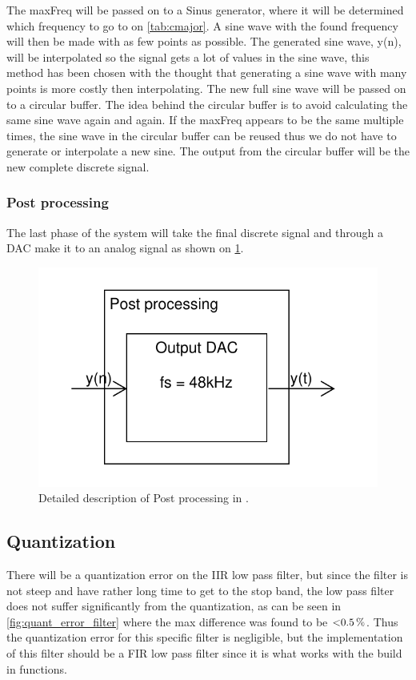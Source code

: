 The maxFreq will be passed on to a Sinus generator, where it will be determined which frequency to go to on \cref{tab:cmajor}.
A sine wave with the found frequency will then be made with as few points as possible.
The generated sine wave, y(n), will be interpolated so the signal gets a lot of values in the sine wave, this method has been chosen with the thought that generating a sine wave with many points is more costly then interpolating.
The new full sine wave will be passed on to a circular buffer.
The idea behind the circular buffer is to avoid calculating the same sine wave again and again.
If the maxFreq appears to be the same multiple times, the sine wave in the circular buffer can be reused thus we do not have to generate or interpolate a new sine.
The output from the circular buffer will be the new complete discrete signal.

\subsubsection{Post processing}
The last phase of the system will take the final discrete signal and through a DAC make it to an analog signal as shown on \cref{fig:DetailedPostPro}.
\begin{figure}
	\centering
	\includegraphics[width=1\linewidth]{gfx/Design/DesignPostPro_IF.pdf}
	\caption{Detailed description of Post processing in \systemName.}
	\label{fig:DetailedPostPro}
\end{figure}

\subsection{Quantization} 
There will be a quantization error on the IIR low pass filter, but since the filter is not steep and have rather long time to get to the stop band, the low pass filter does not suffer significantly from the quantization, as can be seen in \cref{fig:quant_error_filter} where the max difference was found to be $\SI{<0.5}{\percent} $.
Thus the quantization error for this specific filter is negligible, but the implementation of this filter should be a FIR low pass filter since it is what works with the build in functions.

